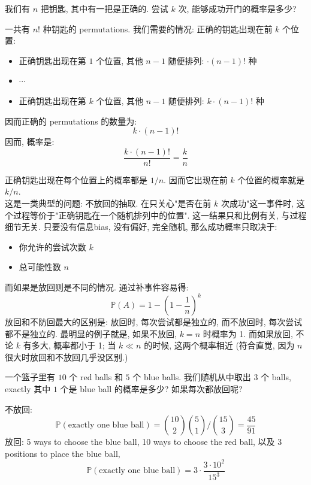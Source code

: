 \begin{example}
    我们有 $n$ 把钥匙, 其中有一把是正确的. 尝试 $k$ 次, 能够成功开门的概率是多少?
    \begin{solution}
        一共有 $n!$ 种钥匙的 permutations. 我们需要的情况: 正确的钥匙出现在前 $k$ 个位置:
        \begin{itemize}
            \item 正确钥匙出现在第 $1$ 个位置, 其他 $n-1$ 随便排列: $\cdot (n-1)!$ 种
            \item $\cdots$
            \item 正确钥匙出现在第 $k$ 个位置, 其他 $n-1$ 随便排列: $k \cdot (n-1)!$ 种
        \end{itemize}
        因而正确的 permutations 的数量为: \[
        k \cdot (n-1)!
        \]
        因而, 概率是: \[
        \frac{k \cdot (n-1)!}{n!} = \frac{k}{n}
        \]
    \end{solution}
\end{example}
\begin{remark}
    正确钥匙出现在每个位置上的概率都是 $1/n$. 因而它出现在前 $k$ 个位置的概率就是 $k/n$.\\
    这是一类典型的问题: 不放回的抽取. 在只关心"是否在前 $k$ 次成功"这一事件时, 这个过程等价于"正确钥匙在一个随机排列中的位置". 这一结果只和比例有关, 与过程细节无关. 只要没有信息bias, 没有偏好, 完全随机, 那么成功概率只取决于:
    \begin{itemize}
        \item 你允许的尝试次数 $k$
        \item 总可能性数 $n$
    \end{itemize}
    而如果是放回则是不同的情况. 通过补事件容易得:
    \[
    \mathbb{P}(A)=1-\left(1-\frac{1}{n}\right)^k
    \]
    放回和不防回最大的区别是: 放回时, 每次尝试都是独立的, 而不放回时, 每次尝试都不是独立的. 最明显的例子就是, 如果不放回, $k=n$ 时概率为 1. 而如果放回, 不论 $k$ 有多大, 概率都小于 1; 当 $k \ll n$ 的时候, 这两个概率相近 (符合直觉, 因为 $n$ 很大时放回和不放回几乎没区别.) 
\end{remark}

\begin{example}
    一个篮子里有 $10$ 个 red balls 和 \(5\) 个 blue balls. 我们随机从中取出 $3$ 个 balls, exactly 其中 $1$ 个是 blue ball 的概率是多少? 如果每次都放回呢?
    \begin{solution}
    不放回:
        \[
        \mathbb{P}{(\text{exactly one blue ball})} = 
        \binom{10}{2} \binom{5}{1} \big/ \binom{15}{3} = \frac{45}{91}
        \]
        放回: 5 ways to choose the blue ball, 10 ways to choose the red ball, 以及 3 positions to place the blue ball, 
        \[
        \mathbb{P}{(\text{exactly one blue ball})} = 
        3\cdot \frac{3 \cdot 10^2}{15^3}
        \]
    \end{solution}
\end{example}




